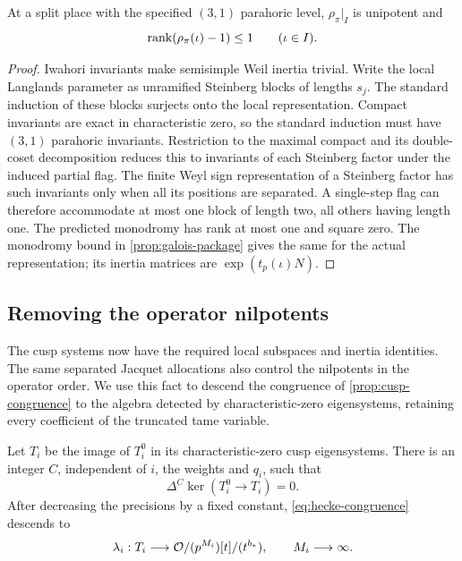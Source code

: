 \begin{lemma}
\label{lem:steinberg-control}
At a split place with the specified $(3,1)$ parahoric level,
$\rho_\pi|_I$ is unipotent and
\[
 \operatorname{rank}(\rho_\pi(\iota)-1)\leq1\qquad(\iota\in I).
\]
\end{lemma}

\begin{proof}
Iwahori invariants make semisimple Weil inertia trivial.  Write the
local Langlands parameter as unramified Steinberg blocks of lengths
$s_j$.  The standard induction of these blocks surjects onto the
local representation.  Compact invariants are exact in characteristic
zero, so the standard induction must have $(3,1)$ parahoric
invariants.  Restriction to the maximal compact and its double-coset
decomposition reduces this to invariants of each Steinberg factor
under the induced partial flag.  The finite Weyl sign representation
of a Steinberg factor has such invariants only when all its positions
are separated.  A single-step flag can therefore accommodate at most
one block of length two, all others having length one.  The predicted
monodromy has rank at most one and square zero.  The monodromy bound
in \cref{prop:galois-package} gives the same for the actual
representation; its inertia matrices are $\exp(t_p(\iota)N)$.
\end{proof}

\subsection{Removing the operator nilpotents}

The cusp systems now have the required local subspaces and inertia
identities.  The same separated Jacquet allocations also control the
nilpotents in the operator order.  We use this fact to descend the
congruence of \cref{prop:cusp-congruence} to the algebra detected by
characteristic-zero eigensystems, retaining every coefficient of the
truncated tame variable.

\begin{proposition}
\label{prop:nilpotent-control}
Let $T_i$ be the image of $T_i^0$ in its characteristic-zero cusp
eigensystems.  There is an integer $C$, independent of $i$, the
weights and $q_i$, such that
\begin{equation}
 \Delta^C\ker(T_i^0\longrightarrow T_i)=0.
 \label{eq:nilpotent-annihilation}
\end{equation}
After decreasing the precisions by a fixed constant,
\cref{eq:hecke-congruence} descends to
\begin{equation}
 \lambda_i:T_i\longrightarrow
       \mathcal O/(p^{M_i})[t]/(t^{b_*}),\qquad M_i\longrightarrow\infty.
 \label{eq:reduced-hecke-congruence}
\end{equation}
\end{proposition}

